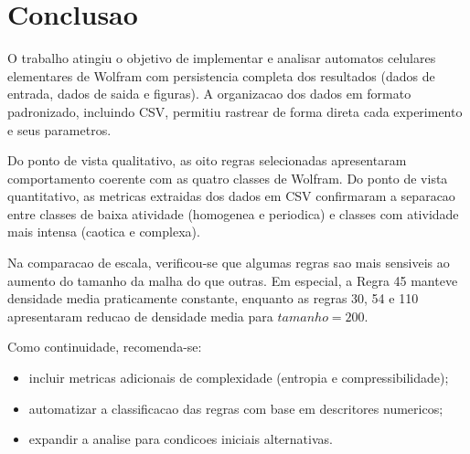 \chapter{Conclusao}
\label{chap_conclusao}

O trabalho atingiu o objetivo de implementar e analisar automatos celulares elementares de Wolfram com persistencia completa dos resultados (dados de entrada, dados de saida e figuras). A organizacao dos dados em formato padronizado, incluindo CSV, permitiu rastrear de forma direta cada experimento e seus parametros.

Do ponto de vista qualitativo, as oito regras selecionadas apresentaram comportamento coerente com as quatro classes de Wolfram. Do ponto de vista quantitativo, as metricas extraidas dos dados em CSV confirmaram a separacao entre classes de baixa atividade (homogenea e periodica) e classes com atividade mais intensa (caotica e complexa).

Na comparacao de escala, verificou-se que algumas regras sao mais sensiveis ao aumento do tamanho da malha do que outras. Em especial, a Regra 45 manteve densidade media praticamente constante, enquanto as regras 30, 54 e 110 apresentaram reducao de densidade media para \(tamanho=200\).

Como continuidade, recomenda-se:
\begin{itemize}
    \item incluir metricas adicionais de complexidade (entropia e compressibilidade);
    \item automatizar a classificacao das regras com base em descritores numericos;
    \item expandir a analise para condicoes iniciais alternativas.
\end{itemize}
